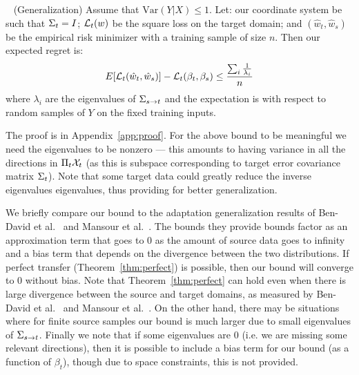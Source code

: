 \begin{theorem}~\label{thm:gen} (Generalization) Assume that
  $\mathrm{Var}(Y|X)\leq 1$.  Let: our coordinate system be such that
  $\Sigma_{t}=I$; $\mathcal{L}_t(w)$ be the square loss on the target domain; and
  $(\hat w_t,\hat w_s)$ be the empirical risk minimizer with a
  training sample of size $n$. Then our expected regret is:
\[
E[\mathcal{L}_t(\hat w_t,\hat w_s)] - \mathcal{L}_t(\beta_t,\beta_s) \leq \frac{\sum_i \frac{1}{\lambda_i}}{n}
\]
where $\lambda_i$ are the eigenvalues of $\Sigma_{s\rightarrow t}$ and the
expectation is with respect to random samples of $Y$ on the fixed
training inputs.
\end{theorem}

The proof is in Appendix~\ref{app:proof}.  For the above bound to be
meaningful we need the eigenvalues to be nonzero --- this amounts to
having variance in all the directions in $\Pi_t \mathcal{X}_t$ (as this is
subspace corresponding to target error covariance matrix
$\Sigma_{t}$). Note that some target data could greatly reduce the inverse
eigenvalues eigenvalues, thus providing for better generalization.

We briefly compare our bound to the adaptation generalization results
of Ben-David et al.~\cite{ben-david07} and Mansour et
al.~\cite{mansour09colt}.  The bounds they provide bounds factor as an
approximation term that goes to 0 as the amount of source data goes to
infinity and a bias term that depends on the divergence between the
two distributions.  If perfect transfer (Theorem~\ref{thm:perfect}) is
possible, then our bound will converge to 0 without bias.  Note that
Theorem~\ref{thm:perfect} can hold even when there is large divergence
between the source and target domains, as measured by Ben-David et
al.~\cite{ben-david07} and Mansour et al.~\cite{mansour09colt}.  On
the other hand, there may be situations where for finite source
samples our bound is much larger due to small eigenvalues of
$\Sigma_{s\rightarrow t}$.  Finally we note that if some eigenvalues are $0$ (i.e. we
are missing some relevant directions), then it is possible to include
a bias term for our bound (as a function of $\beta_t$), though due to
space constraints, this is not provided.

